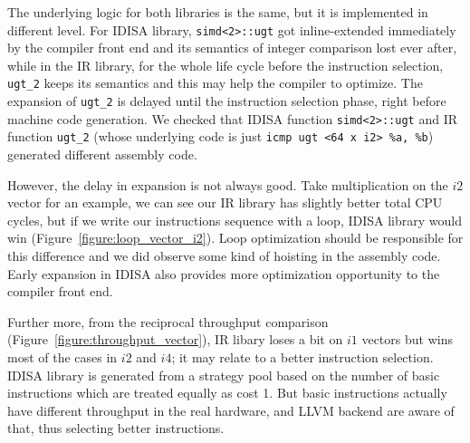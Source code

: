 The underlying logic for both libraries is the same, but it is implemented in different level. For IDISA library, {\tt simd<2>::ugt} got inline-extended immediately by the compiler front end and its semantics of integer comparison lost ever after, while in the IR library, for the whole life cycle before the instruction selection, {\tt ugt\_2} keeps its semantics and this may help the compiler to optimize. The expansion of {\tt ugt\_2} is delayed until the instruction selection phase, right before machine code generation. We checked that IDISA function {\tt simd<2>::ugt} and IR function {\tt ugt\_2} (whose underlying code is just \verb|icmp ugt <64 x i2> %a, %b|) generated different assembly code.

However, the delay in expansion is not always good. Take multiplication on the $i2$ vector for an example, we can see our IR library has slightly better total CPU cycles, but if we write our instructions sequence with a loop, IDISA library would win (Figure~\ref{figure:loop_vector_i2}). Loop optimization should be responsible for this difference and we did observe some kind of hoisting in the assembly code. Early expansion in IDISA also provides more optimization opportunity to the compiler front end.

Further more, from the reciprocal throughput comparison (Figure~\ref{figure:throughput_vector}), IR libary loses a bit on $i1$ vectors but wins most of the cases in $i2$ and $i4$; it may relate to a better instruction selection. IDISA library is generated from a strategy pool based on the number of basic instructions which are treated equally as cost 1. But basic instructions actually have different throughput in the real hardware, and LLVM backend are aware of that, thus selecting better instructions.


